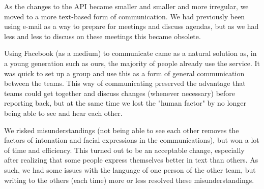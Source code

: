As the changes to the API became smaller and smaller and more irregular, we moved to a more text-based form of communication. We had
previously been using e-mail as a way to prepare for meetings and discuss agendas, but as we had less and less to discuss on these
meetings this became obsolete.

Using Facebook (as a medium) to communicate came as a natural solution as, in a young generation such as ours, the majority of people
already use the service. It was quick to set up a group and use this as a form of general communication between the teams. This way
of communicating preserved the advantage that teams could get together and discuss changes (whenever necessary) before reporting back,
but at the same time we lost the "human factor" by no longer being able to see and hear each other.

We risked misunderstandings (not being able to see each other removes the factors of intonation and facial expressions in the communications),
but won a lot of time and efficiency. This turned out to be an acceptable change, especially after realizing that some people express
themselves better in text than others. As such, we had some issues with the language of one person of the other team, but writing to the
others (each time) more or less resolved these misunderstandings.